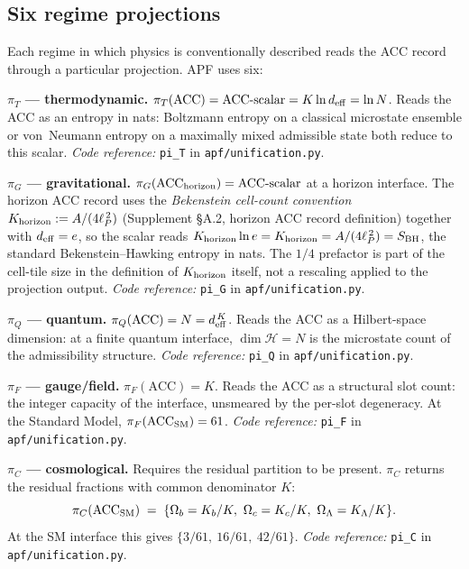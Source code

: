 \documentclass[11pt]{article}
\newcommand{\coderef}[2]{\smallskip\noindent\textit{Code reference:} \texttt{#1} in \texttt{#2}.}
\begin{document}
\subsection{Six regime projections}\label{sec:ledger_projections}

Each regime in which physics is conventionally described reads the ACC record through a particular projection. APF uses six:

\smallskip
\noindent\textbf{$\pi_T$ --- thermodynamic.} $\pi_T(\mathrm{ACC}) = \mathrm{ACC}\text{-scalar} = K \ln d_{\rm eff} = \ln N$. Reads the ACC as an entropy in nats: Boltzmann entropy on a classical microstate ensemble or von~Neumann entropy on a maximally mixed admissible state both reduce to this scalar. \coderef{pi\_T}{apf/unification.py}

\smallskip
\noindent\textbf{$\pi_G$ --- gravitational.} $\pi_G(\mathrm{ACC}_{\rm horizon}) = \mathrm{ACC}\text{-scalar}$ at a horizon interface. The horizon ACC record uses the \emph{Bekenstein cell-count convention} $K_{\rm horizon} := A/(4\ell_P^{\,2})$ (Supplement \S A.2, horizon ACC record definition) together with $d_{\rm eff} = e$, so the scalar reads $K_{\rm horizon} \ln e = K_{\rm horizon} = A/(4\ell_P^{\,2}) = S_{\rm BH}$, the standard Bekenstein--Hawking entropy in nats.  The $1/4$ prefactor is part of the cell-tile size in the definition of $K_{\rm horizon}$ itself, not a rescaling applied to the projection output.  \coderef{pi\_G}{apf/unification.py}

\smallskip
\noindent\textbf{$\pi_Q$ --- quantum.} $\pi_Q(\mathrm{ACC}) = N = d_{\rm eff}^{\,K}$. Reads the ACC as a Hilbert-space dimension: at a finite quantum interface, $\dim\mathcal{H} = N$ is the microstate count of the admissibility structure. \coderef{pi\_Q}{apf/unification.py}

\smallskip
\noindent\textbf{$\pi_F$ --- gauge/field.} $\pi_F(\mathrm{ACC}) = K$. Reads the ACC as a structural slot count: the integer capacity of the interface, unsmeared by the per-slot degeneracy. At the Standard Model, $\pi_F(\mathrm{ACC}_{\rm SM}) = 61$. \coderef{pi\_F}{apf/unification.py}

\smallskip
\noindent\textbf{$\pi_C$ --- cosmological.} Requires the residual partition to be present. $\pi_C$ returns the residual fractions with common denominator $K$:
\[
\pi_C(\mathrm{ACC}_{\rm SM}) \;=\; \{\Omega_b = K_b/K,\ \Omega_c = K_c/K,\ \Omega_\Lambda = K_\Lambda/K\}.
\]
At the SM interface this gives $\{3/61,\ 16/61,\ 42/61\}$. \coderef{pi\_C}{apf/unification.py}
\end{document}
